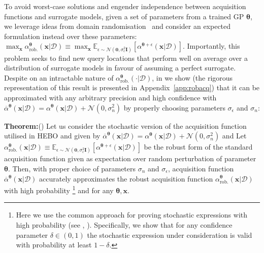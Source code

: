 \documentclass[jair,twoside,11pt,theapa]{article}
\let\cite\shortcite
\theoremstyle{definition}
\newenvironment{theorem}[1]{\par\noindent\textbf{Theorem:}\space#1}{}
\begin{document}
To avoid worst-case solutions and engender independence between acquisition functions and surrogate models, given a set of parameters from a trained GP $\bm{\theta}$, we leverage ideas from domain randomisation~\cite{DR} and consider an expected formulation instead over these parameters: $
   \max_{\bm{x}} \alpha^{\bm{\theta}}_{\text{rob.}}(\bm{x}|\mathcal{D}) \equiv \max_{\bm{x}} \mathbb{E}_{\epsilon \sim \mathcal{N}(\bm{0}, \sigma_{\epsilon}^{2}\bm{I})}\left[\alpha^{\bm{\theta}+\epsilon}(\bm{x}|\mathcal{D})\right]$. 
Importantly, this problem seeks to find new query locations that perform well on average over a distribution of surrogate models in favour of assuming a perfect surrogate. Despite on an intractable nature of  $\alpha^{\bm{\theta}}_{\text{rob.}}(\cdot|\mathcal{D})$, in  we show (the rigorous representation of this result is presented in Appendix~\ref{app:robacq}) that it can be approximated with any arbitrary precision and high confidence with $\overline{\alpha}^{\bm{\theta}} (\bm{x}|\mathcal{D}) = \alpha^{\bm{\theta}} (\bm{x}|\mathcal{D}) + \mathcal{N}(0,\sigma^2_{n})$ by properly choosing  parameters $\sigma_{\epsilon}$ and $\sigma_n$:
\begin{theorem}()
Let us consider the  stochastic version of the acquisition function utilised in HEBO and given by $\overline{\alpha}^{\bm{\theta}} (\bm{x}|\mathcal{D}) = \alpha^{\bm{\theta}} (\bm{x}|\mathcal{D}) + \mathcal{N}(0,\sigma^2_{n})$ and Let $\alpha^{\bm{\theta}}_{\text{rob.}}(\bm{x}|\mathcal{D}) \equiv \mathbb{E}_{\epsilon \sim \mathcal{N}(\bm{0}, \sigma_{\epsilon}^{2}\bm{I})}\left[\alpha^{\bm{\theta}+\epsilon}(\bm{x}|\mathcal{D})\right]$ be the robust form of the standard acquisition function given as expectation over random perturbation of parameter $\bm{\theta}$. Then,  with proper choice of parameters $\sigma_n$ and  $\sigma_{\epsilon}$,  acquisition function $\overline{\alpha}^{\bm{\theta}} (\bm{x}|\mathcal{D}) $ accurately approximates the robust acquisition function $\alpha^{\bm{\theta}}_{\text{rob.}}(\bm{x}|\mathcal{D})$ with high probability \footnote{Here we use the common approach for proving stochastic expressions with high probability (see \cite{jordan_cubic}, \cite{AZ01}). Specifically, we show that for any confidence parameter   $\delta\in(0,1)$ the stochastic expression under consideration is valid with probability at least $1 - \delta$.} and for any $\bm{\theta},\bm{x}$. 
\end{theorem}
\end{document}

